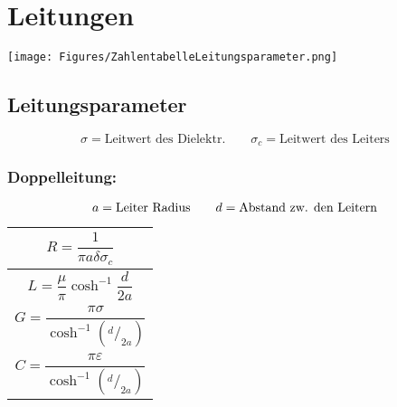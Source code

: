 \section{Leitungen}
\texttt{[image: Figures/ZahlentabelleLeitungsparameter.png]}

\subsection{Leitungsparameter}

{\small\[
        \sigma = \text{Leitwert des Dielektr.} \qquad \sigma_c = \text{Leitwert des Leiters}
    \]}

\subsubsection{Doppelleitung:}
{\small\[
        a = \text{Leiter Radius} \qquad d = \text{Abstand zw. den Leitern} \\
    \]}

{\renewcommand*{\arraystretch}{0.2}
    \begin{tabularx}{0.5\columnwidth}{|X|}
        \hline
        \[R  = \frac{1}{\pi a\delta\sigma_c}\]              \\
        \hline
        \[L = \frac{\mu}{\pi} \cosh^{-1}\frac{d}{2a}\]      \\
        \hline
        \[G = \frac{\pi\sigma}{\cosh^{-1}(^d/_{2a})}\]      \\
        \hline
        \[C = \frac{\pi\varepsilon}{\cosh^{-1}(^d/_{2a})}\] \\
        \hline
    \end{tabularx}}

